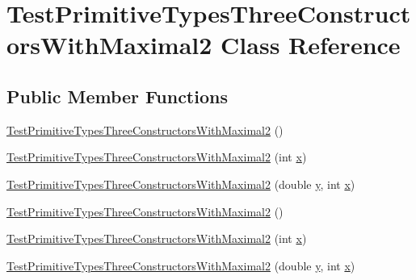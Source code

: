 \hypertarget{classTestPrimitiveTypesThreeConstructorsWithMaximal2}{
\section{TestPrimitiveTypesThreeConstructorsWithMaximal2 Class Reference}
\label{classTestPrimitiveTypesThreeConstructorsWithMaximal2}
}
\subsection*{Public Member Functions}
\begin{DoxyCompactItemize}
\item 
\hyperlink{classTestPrimitiveTypesThreeConstructorsWithMaximal2_a7148bf6cc4c18b41c0c9ec2aa37d541a}{TestPrimitiveTypesThreeConstructorsWithMaximal2} ()
\item 
\hyperlink{classTestPrimitiveTypesThreeConstructorsWithMaximal2_ad443cc6dc73ab54028a299a6f3dcae15}{TestPrimitiveTypesThreeConstructorsWithMaximal2} (int \hyperlink{classTestPrimitiveTypesThreeConstructorsWithMaximal2_a33629372829a82f695df1283b2cee95b}{x})
\item 
\hyperlink{classTestPrimitiveTypesThreeConstructorsWithMaximal2_ae0cc0c1a7ec0f2115a870c4737567419}{TestPrimitiveTypesThreeConstructorsWithMaximal2} (double \hyperlink{classTestPrimitiveTypesThreeConstructorsWithMaximal2_a765424ea939b63074c63d56aa0371d00}{y}, int \hyperlink{classTestPrimitiveTypesThreeConstructorsWithMaximal2_a33629372829a82f695df1283b2cee95b}{x})
\item 
\hyperlink{classTestPrimitiveTypesThreeConstructorsWithMaximal2_a7148bf6cc4c18b41c0c9ec2aa37d541a}{TestPrimitiveTypesThreeConstructorsWithMaximal2} ()
\item 
\hyperlink{classTestPrimitiveTypesThreeConstructorsWithMaximal2_ad443cc6dc73ab54028a299a6f3dcae15}{TestPrimitiveTypesThreeConstructorsWithMaximal2} (int \hyperlink{classTestPrimitiveTypesThreeConstructorsWithMaximal2_a33629372829a82f695df1283b2cee95b}{x})
\item 
\hyperlink{classTestPrimitiveTypesThreeConstructorsWithMaximal2_ae0cc0c1a7ec0f2115a870c4737567419}{TestPrimitiveTypesThreeConstructorsWithMaximal2} (double \hyperlink{classTestPrimitiveTypesThreeConstructorsWithMaximal2_a765424ea939b63074c63d56aa0371d00}{y}, int \hyperlink{classTestPrimitiveTypesThreeConstructorsWithMaximal2_a33629372829a82f695df1283b2cee95b}{x})
\end{DoxyCompactItemize}
